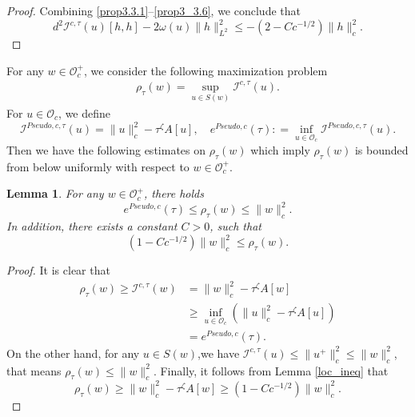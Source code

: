\documentclass{amsart}
\theoremstyle{plain}
\newtheorem{lemma}[theorem]{Lemma}
\theoremstyle{definition}
\theoremstyle{remark}
\numberwithin{equation}{section} \numberwithin{figure}{section}
\begin{document}
\begin{proof}
  Combining \eqref{prop3.3.1}--\eqref{prop3_3.6}, we conclude that
  \[
  d^2\mathcal{I}^{c,\tau}(u)[h, h] - 2 \omega(u) \|h\|_{L^2}^2 \leq - (2 - C c^{-1/2}) \|h\|_c^2.
  \]
  \end{proof}
  

For any $w \in \mathcal{O}_c^+$, we consider the following maximization problem
\begin{align}\label{111}
  \rho_\tau(w)=\sup _{{u} \in   S(w)} \mathcal{I}^{c, \tau }({u}) .
\end{align}
For $u\in \mathcal{O}_c$,
we define
$$ \mathcal{I}^{Pseudo, c, \tau}(u) = \|u\|_c^2- \tau^{\zeta} A[u] ,\quad
e^{Pseudo,c}(\tau) : = \inf_{u\in \mathcal{O}_c} \mathcal{I}^{Pseudo, c, \tau}(u).
$$
Then we have the following estimates on $ \rho_\tau(w)$ which imply $\rho_\tau(w) $
is bounded from below uniformly with respect to $w\in \mathcal{O}_c^+$.
\begin{lemma}\label{lemm:3.2}
  For any $w \in \mathcal{O}_c^{+}$, there holds
  $$
  e^{Pseudo,c}(\tau) \leq \rho_\tau(w) \leq \|w\|_c^2.
  $$
  In addition, there exists a constant $  C  >0$, such that $$ (1 -   Cc^{-1/2}  )\|w\|_{c}^2\leq \rho_\tau(w). $$

\end{lemma}
\begin{proof}

It is clear that
\begin{equation*}
    \begin{split}
        \rho_\tau(w) \geqslant\mathcal{I}^{c,\tau}(w)&= \|w\|_c^2 - \tau^{\zeta}A[w] \\
        &\geq 
        \inf_{u\in \mathcal{O}_c} \left(\|u\|_c^2- \tau^{\zeta} A[u] \right)\\
        &=
e^{Pseudo,c}(\tau ).
    \end{split}
\end{equation*}
On the other hand, for any ${u} \in   S(w)$,we have $\mathcal{I}^{c, \tau }({u}) \leq \| u^+ \| _{ c}^2 \leq \|w\|_{   c}^2$, that means $ \rho_\tau(w)  \leq \|w\|_{  c}^2$.
Finally, it follows from Lemma \ref{loc_ineq}
that 
$$
\rho_\tau(w) \geq \|w\|_c^2 - \tau^{\zeta}A[w] 
\geq (1 -   Cc^{-1/2}  )\|w\|_{c}^2.
$$
\end{proof}
\end{document}
